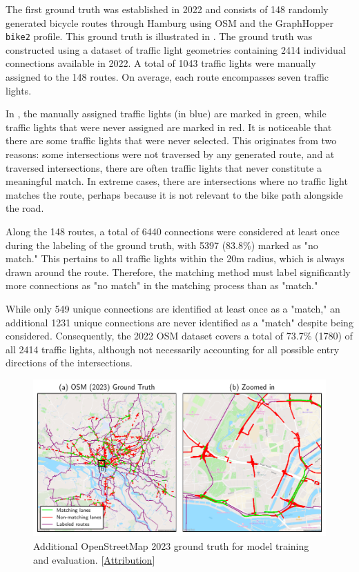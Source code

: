 The first ground truth was established in 2022 and consists of 148 randomly generated bicycle routes through Hamburg using OSM and the GraphHopper \texttt{bike2} profile. This ground truth is illustrated in . The ground truth was constructed using a dataset of traffic light geometries containing 2414 individual connections available in 2022. A total of 1043 traffic lights were manually assigned to the 148 routes. On average, each route encompasses seven traffic lights.

In , the manually assigned traffic lights (in blue) are marked in green, while traffic lights that were never assigned are marked in red. It is noticeable that there are some traffic lights that were never selected. This originates from two reasons: some intersections were not traversed by any generated route, and at traversed intersections, there are often traffic lights that never constitute a meaningful match. In extreme cases, there are intersections where no traffic light matches the route, perhaps because it is not relevant to the bike path alongside the road.

Along the 148 routes, a total of 6440 connections were considered at least once during the labeling of the ground truth, with 5397 (83.8\%) marked as "no match." This pertains to all traffic lights within the 20m radius, which is always drawn around the route. Therefore, the matching method must label significantly more connections as "no match" in the matching process than as "match."

While only 549 unique connections are identified at least once as a "match," an additional 1231 unique connections are never identified as a "match" despite being considered. Consequently, the 2022 OSM dataset covers a total of 73.7\% (1780) of all 2414 traffic lights, although not necessarily accounting for all possible entry directions of the intersections.

\begin{figure}[t]
\centering 
\includegraphics[width=\linewidth]{images/matching-ground-truth-osm.pdf}
\caption{Additional OpenStreetMap 2023 ground truth for model training and evaluation. [\hyperref[attribution]{Attribution}]}
\label{fig:matching-ground-truth-osm}
\end{figure}

